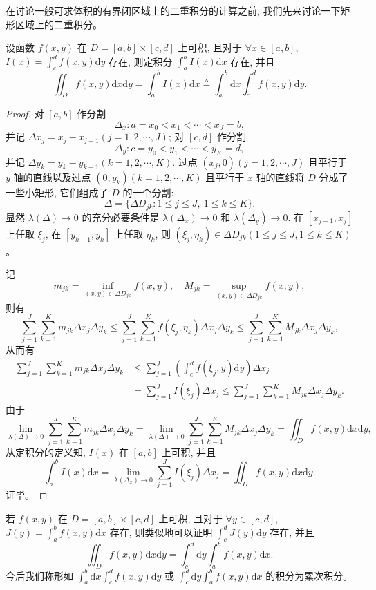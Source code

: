 \documentclass[12pt,fontset=fandol]{ctexart}
\begin{document}
在讨论一般可求体积的有界闭区域上的二重积分的计算之前, 我们先来讨论一下矩形区域上的二重积分。

\begin{theorem}\label{course-theorem-15-3-1}\quad 设函数 $f(x,y)$ 在 $D=[a,b]\times[c,d]$ 上可积, 且对于 $\forall x\in[a,b]$, $I(x)=\int_c^d f(x,y)\mathrm dy$ 存在, 则定积分 $\int_a^b I(x)\mathrm dx$ 存在, 并且
\[
  \iint_D f(x,y)\mathrm dx\mathrm dy
  =\int_a^b I(x)\mathrm dx
  \triangleq\int_a^b\mathrm dx\int_c^d f(x,y)\mathrm dy.
\]

\end{theorem}
\begin{proof}\quad 对 $[a,b]$ 作分割
\[
  \Delta_x:a=x_0<x_1<\cdots<x_J=b,
\]
并记 $\Delta x_j=x_j-x_{j-1}(j=1,2,\cdots,J)$; 对 $[c,d]$ 作分割
\[
  \Delta_y:c=y_0<y_1<\cdots<y_K=d,
\]
并记 $\Delta y_k=y_k-y_{k-1}(k=1,2,\cdots,K)$. 过点 $(x_j,0)(j=1,2,\cdots,J)$ 且平行于 $y$ 轴的直线以及过点 $(0,y_k)(k=1,2,\cdots,K)$ 且平行于 $x$ 轴的直线将 $D$ 分成了一些小矩形, 它们组成了 $D$ 的一个分割:
\[
  \Delta=\{\Delta D_{jk}:1\leqslant j\leqslant J,\ 1\leqslant k\leqslant K\}.
\]
显然 $\lambda(\Delta)\to0$ 的充分必要条件是 $\lambda(\Delta_x)\to0$ 和 $\lambda(\Delta_y)\to0$. 在 $[x_{j-1},x_j]$ 上任取 $\xi_j$, 在 $[y_{k-1},y_k]$ 上任取 $\eta_k$, 则 $(\xi_j,\eta_k)\in\Delta D_{jk}(1\leqslant j\leqslant J,1\leqslant k\leqslant K)$。

记
\[
  m_{jk}=\inf_{(x,y)\in\Delta D_{jk}}f(x,y),\quad
  M_{jk}=\sup_{(x,y)\in\Delta D_{jk}}f(x,y),
\]
则有
\[
  \sum_{j=1}^J\sum_{k=1}^K m_{jk}\Delta x_j\Delta y_k
  \leqslant \sum_{j=1}^J\sum_{k=1}^K f(\xi_j,\eta_k)\Delta x_j\Delta y_k
  \leqslant \sum_{j=1}^J\sum_{k=1}^K M_{jk}\Delta x_j\Delta y_k,
\]
从而有
\[
\begin{aligned}
  \sum_{j=1}^J\sum_{k=1}^K m_{jk}\Delta x_j\Delta y_k
  &\leqslant \sum_{j=1}^J\left(\int_c^d f(\xi_j,y)\mathrm dy\right)\Delta x_j\\
  &=\sum_{j=1}^J I(\xi_j)\Delta x_j
  \leqslant \sum_{j=1}^J\sum_{k=1}^K M_{jk}\Delta x_j\Delta y_k.
\end{aligned}
\]
由于
\[
  \lim_{\lambda(\Delta)\to0}\sum_{j=1}^J\sum_{k=1}^K m_{jk}\Delta x_j\Delta y_k
  =
  \lim_{\lambda(\Delta)\to0}\sum_{j=1}^J\sum_{k=1}^K M_{jk}\Delta x_j\Delta y_k
  =
  \iint_D f(x,y)\mathrm dx\mathrm dy,
\]
从定积分的定义知, $I(x)$ 在 $[a,b]$ 上可积, 并且
\[
  \int_a^b I(x)\mathrm dx
  =
  \lim_{\lambda(\Delta_x)\to0}\sum_{j=1}^J I(\xi_j)\Delta x_j
  =
  \iint_D f(x,y)\mathrm dx\mathrm dy.
\]
证毕。

\end{proof}
\noindent{}\quad 若 $f(x,y)$ 在 $D=[a,b]\times[c,d]$ 上可积, 且对于 $\forall y\in[c,d]$, $J(y)=\int_a^b f(x,y)\mathrm dx$ 存在, 则类似地可以证明 $\int_c^d J(y)\mathrm dy$ 存在, 并且
\[
  \iint_D f(x,y)\mathrm dx\mathrm dy
  =
  \int_c^d\mathrm dy\int_a^b f(x,y)\mathrm dx.
\]
今后我们称形如 $\int_a^b\mathrm dx\int_c^d f(x,y)\mathrm dy$ 或 $\int_c^d\mathrm dy\int_a^b f(x,y)\mathrm dx$ 的积分为累次积分。
\end{document}
